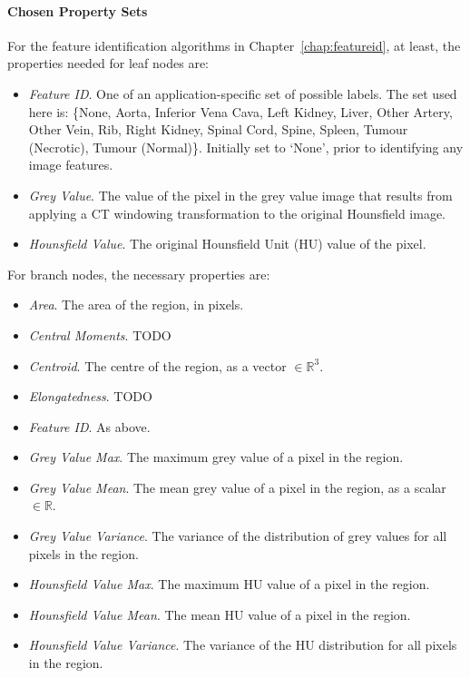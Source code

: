 \paragraph{Chosen Property Sets}

For the feature identification algorithms in Chapter~\ref{chap:featureid}, at least, the properties needed for leaf nodes are:

\begin{itemize}

\item \emph{Feature ID}. One of an application-specific set of possible labels. The set used here is: \{None, Aorta, Inferior Vena Cava, Left Kidney, Liver, Other Artery, Other Vein, Rib, Right Kidney, Spinal Cord, Spine, Spleen, Tumour (Necrotic), Tumour (Normal)\}. Initially set to `None', prior to identifying any image features.

\item \emph{Grey Value}. The value of the pixel in the grey value image that results from applying a CT windowing transformation to the original Hounsfield image.

\item \emph{Hounsfield Value}. The original Hounsfield Unit (HU) value of the pixel.

\end{itemize}

\noindent For branch nodes, the necessary properties are:

\begin{itemize}
\item \emph{Area}. The area of the region, in pixels.
\item \emph{Central Moments}. TODO
\item \emph{Centroid}. The centre of the region, as a vector $\in \mathbb{R}^3$.
\item \emph{Elongatedness}. TODO
\item \emph{Feature ID}. As above.
\item \emph{Grey Value Max}. The maximum grey value of a pixel in the region.
\item \emph{Grey Value Mean}. The mean grey value of a pixel in the region, as a scalar $\in \mathbb{R}$.
\item \emph{Grey Value Variance}. The variance of the distribution of grey values for all pixels in the region.
\item \emph{Hounsfield Value Max}. The maximum HU value of a pixel in the region.
\item \emph{Hounsfield Value Mean}. The mean HU value of a pixel in the region.
\item \emph{Hounsfield Value Variance}. The variance of the HU distribution for all pixels in the region.
\end{itemize}

